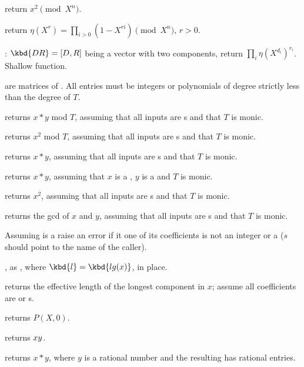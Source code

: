  return $x^2\pmod{X^n}$.

 return $\eta(X^r) = \prod_{i>0} (1-X^{ri})
\pmod{X^n}$, $r > 0$.

: $\kbd{DR}= [D,R]$ being a vector
with two  components, return $\prod_i \eta(X^{d_i})^{r_i}$.
Shallow function.


 are matrices of . All entries must be integers or
polynomials of degree strictly less than the degree of $T$.

 returns $x*y$ mod $T$, assuming
that all inputs are s and that $T$ is monic.

 returns $x^2$ mod $T$, assuming
that all inputs are s and that $T$ is monic.


 returns $x*y$, assuming
that all inputs are s and that $T$ is monic.

 returns $x*y$, assuming
that $x$ is a , $y$ is a  and $T$ is monic.

 returns $x^2$, assuming
that all inputs are s and that $T$ is monic.

 returns the gcd of $x$ and $y$,
assuming that all inputs are s and that $T$ is monic.


 Assuming  is a 
raise an error if it one of its coefficients is not an integer or a 
($s$ should point to the name of the caller).

, as , where
$\kbd{l} = \kbd{lg(x)}$, in place.

 returns the effective length of the longest
component in $x$; assume all coefficients are  or s.

 returns $P(X, 0)$.

 returns $x\*y$.

 returns $x*y$, where $y$ is a rational number
and the resulting  has rational entries.

